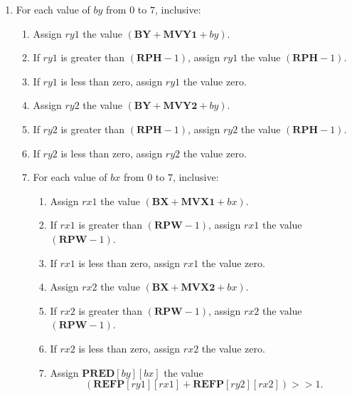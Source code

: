 \documentclass[9pt,letterpaper]{book}
\newcommand{\idx}[1]{{\ensuremath{\mathit{#1}}}}
\newcommand{\bitvar}[1]{\ensuremath{\mathbf{\bm{#1}}}}
\newcommand{\locvar}[1]{\ensuremath{\mathrm{#1}}}
\numberwithin{equation}{chapter}
\numberwithin{figure}{chapter}
\numberwithin{table}{chapter}
\begin{document}
\begin{enumerate}
\item
For each value of \locvar{\idx{by}} from $0$ to $7$, inclusive:
\begin{enumerate}
\item
Assign \locvar{\idx{ry1}} the value
 $(\bitvar{BY}+\bitvar{MVY1}+\locvar{\idx{by}})$.
\item
If \locvar{\idx{ry1}} is greater than $(\bitvar{RPH}-1)$, assign
 \locvar{\idx{ry1}} the value $(\bitvar{RPH}-1)$.
\item
If \locvar{\idx{ry1}} is less than zero, assign \locvar{\idx{ry1}} the value
 zero.
\item
Assign \locvar{\idx{ry2}} the value
 $(\bitvar{BY}+\bitvar{MVY2}+\locvar{\idx{by}})$.
\item
If \locvar{\idx{ry2}} is greater than $(\bitvar{RPH}-1)$, assign
 \locvar{\idx{ry2}} the value $(\bitvar{RPH}-1)$.
\item
If \locvar{\idx{ry2}} is less than zero, assign \locvar{\idx{ry2}} the value
 zero.
\item
For each value of \locvar{\idx{bx}} from $0$ to $7$, inclusive:
\begin{enumerate}
\item
Assign \locvar{\idx{rx1}} the value
 $(\bitvar{BX}+\bitvar{MVX1}+\locvar{\idx{bx}})$.
\item
If \locvar{\idx{rx1}} is greater than $(\bitvar{RPW}-1)$, assign
 \locvar{\idx{rx1}} the value $(\bitvar{RPW}-1)$.
\item
If \locvar{\idx{rx1}} is less than zero, assign \locvar{\idx{rx1}} the value
 zero.
\item
Assign \locvar{\idx{rx2}} the value
 $(\bitvar{BX}+\bitvar{MVX2}+\locvar{\idx{bx}})$.
\item
If \locvar{\idx{rx2}} is greater than $(\bitvar{RPW}-1)$, assign
 \locvar{\idx{rx2}} the value $(\bitvar{RPW}-1)$.
\item
If \locvar{\idx{rx2}} is less than zero, assign \locvar{\idx{rx2}} the value
 zero.
\item
Assign $\bitvar{PRED}[\locvar{\idx{by}}][\locvar{\idx{bx}}]$ the value
\begin{equation*}
 (\bitvar{REFP}[\locvar{\idx{ry1}}][\locvar{\idx{rx1}}]+
 \bitvar{REFP}[\locvar{\idx{ry2}}][\locvar{\idx{rx2}}])>>1.
\end{equation*}
\end{enumerate}
\end{enumerate}
\end{enumerate}
\end{document}
